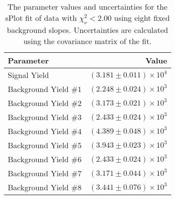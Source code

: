 
\begin{table}[ht]
    \begin{center}
        \begin{tabular}{lr}\toprule
            Parameter & Value \\\midrule
            Signal Yield & $(3.181 \pm 0.011) \times 10^{4}$ \\
            Background Yield $\#1$ & $(2.248 \pm 0.024) \times 10^{3}$ \\
            Background Yield $\#2$ & $(3.173 \pm 0.021) \times 10^{3}$ \\
            Background Yield $\#3$ & $(2.433 \pm 0.024) \times 10^{3}$ \\
            Background Yield $\#4$ & $(4.389 \pm 0.048) \times 10^{3}$ \\
            Background Yield $\#5$ & $(3.943 \pm 0.023) \times 10^{3}$ \\
            Background Yield $\#6$ & $(2.433 \pm 0.024) \times 10^{3}$ \\
            Background Yield $\#7$ & $(3.171 \pm 0.044) \times 10^{3}$ \\
            Background Yield $\#8$ & $(3.441 \pm 0.076) \times 10^{3}$ \\\bottomrule
        \end{tabular}
        \caption{The parameter values and uncertainties for the sPlot fit of data with $\chi^2_\nu < 2.00$ using eight fixed background slopes. Uncertainties are calculated using the covariance matrix of the fit.}\label{tab:splot-fit-results-chisqdof-2.00-fixed-8}
    \end{center}
\end{table}
